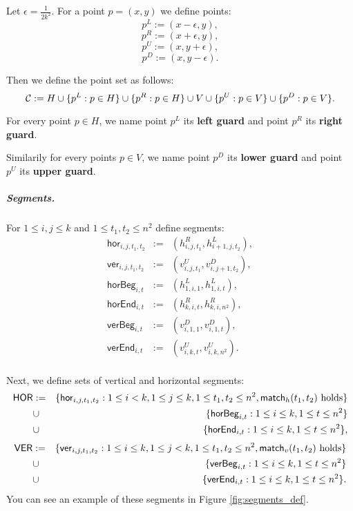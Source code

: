 Let $\epsilon = \frac{1}{2k^2}$.
For a point $p = (x, y)$ we define points:
$$p^{L} := (x - \epsilon, y),$$
$$p^{R} := (x + \epsilon, y),$$
$$p^{U} := (x, y + \epsilon),$$
$$p^{D} := (x, y - \epsilon).$$

Then we define the point set as follows:
$$\mathcal{C} := H \cup \{p^L : p \in H\} \cup \{p^R : p \in H\}
\cup V \cup \{p^U : p \in V\} \cup \{p^D : p \in V\}.$$

\begin{defi}
	\label{guard_def}
	For every point $p \in H$, we name point $p^L$ its \textbf{left guard}
	and point $p^R$ its \textbf{right guard}.
	
	Similarily for every points $p \in V$, we name point $p^D$ its \textbf{lower guard}
	and point $p^U$ its \textbf{upper guard}.
\end{defi}

\subparagraph{Segments.}
\newcommand{\hor}[4]{\mathsf{hor}_{#1,#2,#3,#4}}
\newcommand{\ver}[4]{\mathsf{ver}_{#1,#2,#3,#4}}
\newcommand{\horbeg}[2]{\mathsf{horBeg}_{#1,#2}}
\newcommand{\verbeg}[2]{\mathsf{verBeg}_{#1,#2}}
\newcommand{\horend}[2]{\mathsf{horEnd}_{#1,#2}}
\newcommand{\verend}[2]{\mathsf{verEnd}_{#1,#2}}

For $1 \le i,j \le k$ and $1 \le t_1, t_2 \le n^2$ define segments:
\begin{eqnarray*}
\hor{i}{j}{t_1}{t_2} & := & (h^R_{i,j,t_1}, h^L_{i+1, j, t_2}), \\
\ver{i}{j}{t_1}{t_2} & := & (v^U_{i,j,t_1}, v^D_{i, j+1, t_2}), \\
\horbeg{i}{t} & := & (h^L_{1, i, 1}, h^L_{1, i, t}), \\
\horend{i}{t} & := & (h^R_{k, i, t}, h^R_{k, i, n^2}), \\
\verbeg{i}{t} & := & (v^D_{i, 1, 1}, v^D_{i, 1, t}), \\
\verend{i}{t} & := & (v^U_{i, k, t}, v^U_{i, k, n^2}). \\
\end{eqnarray*}

\newcommand{\allhor}{\mathsf{HOR}}
\newcommand{\allver}{\mathsf{VER}}
\newcommand{\alldiag}{\mathsf{DIAG}}

Next, we define sets of vertical and horizontal segments:
\begin{eqnarray*}
\allhor &:= &\{\hor{i}{j}{t_1}{t_2} : 1 \le i < k, 1 \le j \le k,
1 \le t_1, t_2 \le n^2, \matchh(t_1, t_2) \text{ holds}\} \\
&\cup &\{\horbeg{i}{t} : 1 \le i \le k, 1 \le t \le n^2\}
\\
&\cup &\{\horend{i}{t} : 1 \le i \le k, 1 \le t \le n^2\},
\end{eqnarray*}
\begin{eqnarray*}
\allver &:= &\{\ver{i}{j}{t_1}{t_2} : 1 \le i \le k, 1 \le j < k,
1 \le t_1, t_2 \le n^2, \matchv(t_1, t_2) \text{ holds}\} \\
&\cup &\{\verbeg{i}{t} : 1 \le i \le k, 1 \le t \le n^2\}
\\
&\cup &\{\verend{i}{t} : 1 \le i \le k, 1 \le t \le n^2\}.
\end{eqnarray*}
You can see an example of these segments in Figure \ref{fig:segments_def}.


